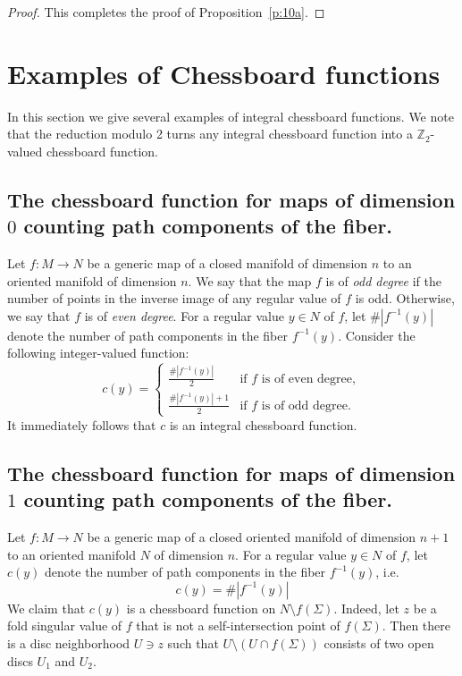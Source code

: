 \documentclass[12pt]{amsart}
\def \Z{\mathbb{Z}}
\def\co{\colon}
\theoremstyle{definition}
\begin{document}
\begin{proof}
This completes the proof of Proposition~\ref{p:10a}.
\end{proof}



\section{Examples of Chessboard functions}\label{s:7}

 In this section we give several examples of integral chessboard functions. We note that the reduction modulo 2 turns any integral chessboard function into a $\Z_2$-valued chessboard function. 



\subsection{The chessboard function for maps of dimension $0$ counting path components of the fiber.}

Let $f\co M\to N$ be a generic map of a closed manifold of dimension $n$ to an oriented manifold of dimension $n$. We say that the map $f$ is of \emph{odd degree} if the number of points in the inverse image of any regular value of $f$ is odd. Otherwise, we say that $f$ is of \emph{even degree}.  For a regular value $y \in N$ of $f$, let $\#|f^{-1}(y)|$ denote the number of path components in the fiber $f^{-1}(y)$.  Consider the following integer-valued function:
\[ c(y) = \begin{cases} 
              \frac{\#|f^{-1}(y)|}{2}  & \text{if } f \text{ is of even degree}, \\
               \frac{\#|f^{-1}(y)|+1}{2}  & \text{if } f \text{ is of odd degree}. 
              \end{cases}
\]
 It immediately follows that $c$ is an integral chessboard function. 


\subsection{The chessboard function for maps of dimension $1$ counting path components of the fiber.}\label{ss:7.2}

Let $f\co M\to N$ be a generic map of a closed oriented manifold of dimension $n+1$ to an oriented manifold $N$ of dimension $n$. For a regular value $y \in N$ of $f$, let $c(y)$ denote the number of path components in the fiber $f^{-1}(y)$, i.e.  
\[
c(y) = \#|f^{-1}(y)|
\]
We claim that $c(y)$ is a chessboard function on $N\setminus f(\Sigma)$. Indeed, let $z$ be a fold singular value of $f$ that is not a self-intersection point of $f(\Sigma)$. Then there is a disc neighborhood $U \ni z$ such that $U\setminus (U\cap f(\Sigma))$ consists of two open discs $U_1$ and $U_2$. 
\end{document}
